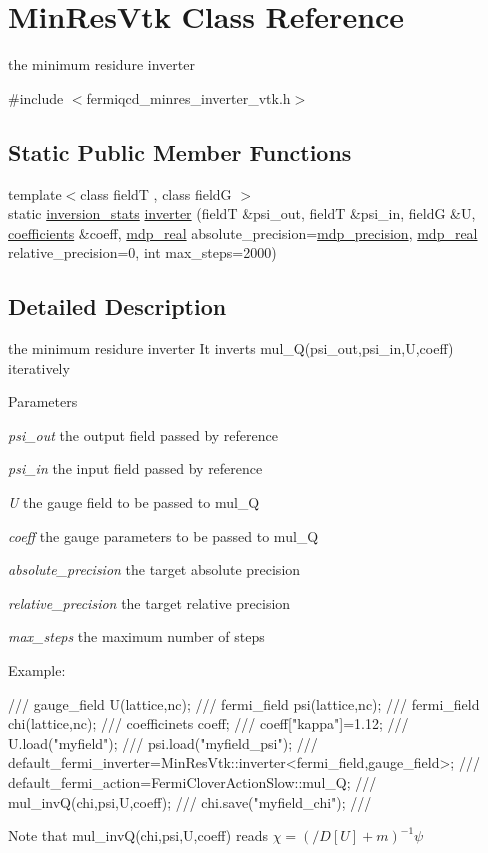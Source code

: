 \hypertarget{class_min_res_vtk}{
\section{MinResVtk Class Reference}
\label{class_min_res_vtk}
}


the minimum residure inverter  


{\ttfamily \#include $<$fermiqcd\_\-minres\_\-inverter\_\-vtk.h$>$}\subsection*{Static Public Member Functions}
\begin{DoxyCompactItemize}
\item 
{\footnotesize template$<$class fieldT , class fieldG $>$ }\\static \hyperlink{classinversion__stats}{inversion\_\-stats} \hyperlink{class_min_res_vtk_aa64a387a3e60246d6a582e4e746f12e9}{inverter} (fieldT \&psi\_\-out, fieldT \&psi\_\-in, fieldG \&U, \hyperlink{classcoefficients}{coefficients} \&coeff, \hyperlink{mdp__global__vars_8h_a049e4c1d4e74d644878a42f9909463e4}{mdp\_\-real} absolute\_\-precision=\hyperlink{mdp__global__vars_8h_a443a4ca745298420893e113a7ac926a9}{mdp\_\-precision}, \hyperlink{mdp__global__vars_8h_a049e4c1d4e74d644878a42f9909463e4}{mdp\_\-real} relative\_\-precision=0, int max\_\-steps=2000)
\end{DoxyCompactItemize}


\subsection{Detailed Description}
the minimum residure inverter It inverts mul\_\-Q(psi\_\-out,psi\_\-in,U,coeff) iteratively 
\begin{DoxyParams}{Parameters}
\item[{\em psi\_\-out}]the output field passed by reference \item[{\em psi\_\-in}]the input field passed by reference \item[{\em U}]the gauge field to be passed to mul\_\-Q \item[{\em coeff}]the gauge parameters to be passed to mul\_\-Q \item[{\em absolute\_\-precision}]the target absolute precision \item[{\em relative\_\-precision}]the target relative precision \item[{\em max\_\-steps}]the maximum number of steps\end{DoxyParams}
Example: \begin{DoxyVerb}
/// gauge_field U(lattice,nc);
/// fermi_field psi(lattice,nc);
/// fermi_field chi(lattice,nc);
/// coefficinets coeff;
/// coeff["kappa"]=1.12;
/// U.load("myfield");
/// psi.load("myfield_psi");
/// default_fermi_inverter=MinResVtk::inverter<fermi_field,gauge_field>;
/// default_fermi_action=FermiCloverActionSlow::mul_Q;
/// mul_invQ(chi,psi,U,coeff);
/// chi.save("myfield_chi");
/// \end{DoxyVerb}
 Note that mul\_\-invQ(chi,psi,U,coeff) reads $ \chi=(/\!\!\!D[U]+m)^{-1}\psi $ 

